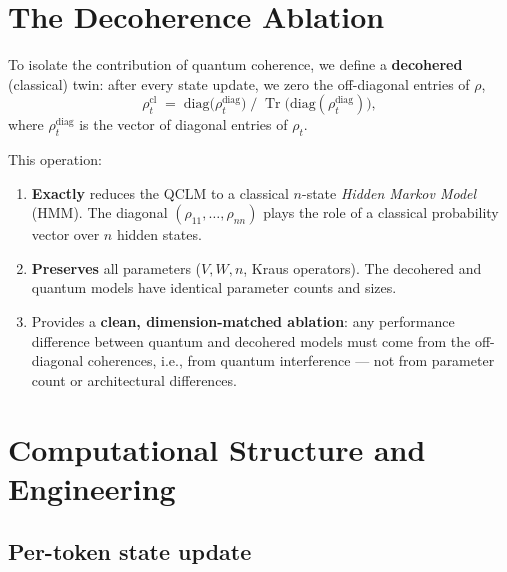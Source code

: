 \documentclass[11pt,a4paper]{article}
\newcommand{\Tr}{\operatorname{Tr}}
\theoremstyle{plain}
\begin{document}
\section{The Decoherence Ablation}

To isolate the contribution of quantum coherence, we define a
\textbf{decohered} (classical) twin: after every state update, we zero
the off-diagonal entries of $\rho$,
\begin{equation}\label{eq:decohere}
  \rho_t^{\mathrm{cl}} \;=\;
  \mathrm{diag}\!\bigl(\rho_t^{\mathrm{diag}}\bigr)
  \;\Big/\;
  \Tr\!\bigl(\mathrm{diag}(\rho_t^{\mathrm{diag}})\bigr),
\end{equation}
where $\rho_t^{\mathrm{diag}}$ is the vector of diagonal entries of
$\rho_t$.

This operation:
\begin{enumerate}
\item \textbf{Exactly} reduces the QCLM to a classical $n$-state
  \emph{Hidden Markov Model} (HMM). The diagonal $(\rho_{11},\ldots,\rho_{nn})$
  plays the role of a classical probability vector over $n$ hidden states.
\item \textbf{Preserves} all parameters ($V,W,n$, Kraus operators).
  The decohered and quantum models have identical parameter counts and
  sizes.
\item Provides a \textbf{clean, dimension-matched ablation}: any
  performance difference between quantum and decohered models must come
  from the off-diagonal coherences, i.e., from quantum interference ---
  not from parameter count or architectural differences.
\end{enumerate}

\section{Computational Structure and Engineering}

\subsection{Per-token state update}
\end{document}
